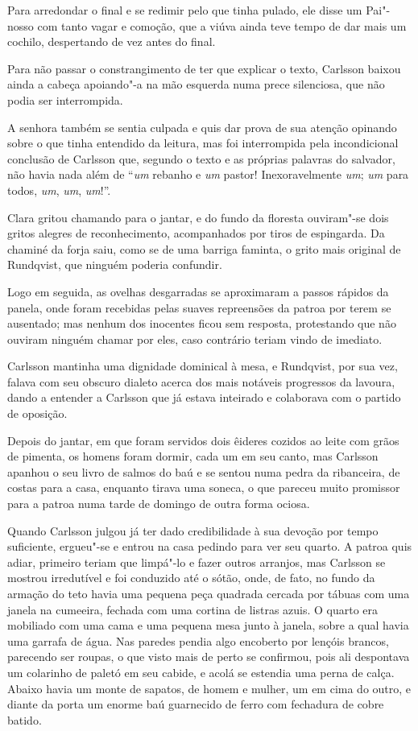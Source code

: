 Para arredondar o final e se redimir pelo que tinha pulado, ele disse um
Pai"-nosso com tanto vagar e comoção, que a viúva ainda teve tempo de dar mais um
cochilo, despertando de vez antes do final.

Para não passar o constrangimento de ter que explicar o texto, Carlsson baixou
ainda a cabeça apoiando"-a na mão esquerda numa prece silenciosa, que não podia
ser interrompida.

A senhora também se sentia culpada e quis dar prova de sua atenção opinando
sobre o que tinha entendido da leitura, mas foi interrompida pela incondicional conclusão
de Carlsson que, segundo o texto e as próprias palavras do salvador, não havia
nada além de ``\textit{um} rebanho e \textit{um} pastor! Inexoravelmente
\textit{um}; \textit{um} para todos, \textit{um}, \textit{um}, \textit{um}!''.

Clara gritou chamando para o jantar, e do fundo da floresta ouviram"-se dois
gritos alegres de reconhecimento, acompanhados por tiros de espingarda. Da
chaminé da forja saiu, como se de uma barriga faminta, o grito mais original de
Rundqvist, que ninguém poderia confundir.

Logo em seguida, as ovelhas desgarradas se aproximaram a passos rápidos da
 panela, onde foram recebidas pelas suaves repreensões da patroa por terem se
ausentado; mas nenhum dos inocentes ficou sem resposta, protestando que não
ouviram ninguém chamar por eles, caso contrário teriam vindo de imediato.

Carlsson mantinha uma dignidade dominical à mesa, e Rundqvist, por sua vez, falava com
seu obscuro dialeto acerca dos mais notáveis progressos da lavoura, dando a
entender a Carlsson que já estava inteirado e colaborava com o partido de
oposição.

Depois do jantar, em que foram servidos dois êideres cozidos ao leite com grãos
de pimenta, os homens foram dormir, cada um em seu canto, mas Carlsson apanhou o
seu livro de salmos do baú e se sentou numa pedra da ribanceira, de costas para
a casa, enquanto tirava uma soneca, o que pareceu muito promissor para a patroa
numa tarde de domingo de outra forma ociosa.

Quando Carlsson julgou já ter dado credibilidade à sua devoção por tempo
suficiente, ergueu"-se e entrou na casa pedindo para ver seu quarto. A patroa
quis adiar, primeiro teriam que limpá"-lo e fazer outros arranjos, mas Carlsson
se mostrou irredutível e foi conduzido até o sótão, onde, de fato, no fundo da
armação do teto havia uma pequena peça quadrada cercada por tábuas com uma
janela na cumeeira, fechada com uma cortina de listras azuis. O
quarto era mobiliado com uma cama e uma pequena mesa junto à janela, sobre a
qual havia uma garrafa de água. Nas paredes pendia algo encoberto por lençóis
brancos, parecendo ser roupas, o que visto mais de perto se confirmou, pois 
ali despontava um colarinho de paletó em seu cabide, e acolá se estendia uma
perna de calça. Abaixo havia um monte de sapatos, de homem e mulher, um em cima
do outro, e diante da porta um enorme baú guarnecido de ferro com fechadura de
cobre batido.

